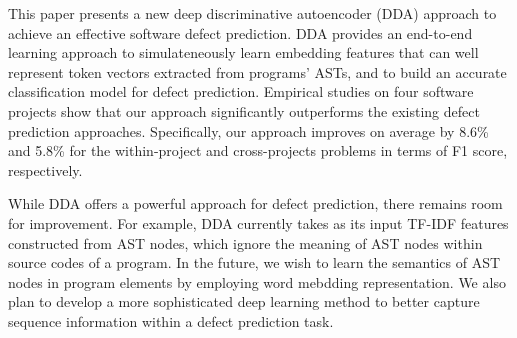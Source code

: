 
This paper presents a new deep  discriminative autoencoder (DDA) approach to achieve an effective software defect prediction. DDA provides an end-to-end learning approach to simulateneously learn embedding features that can well represent token vectors extracted from programs' ASTs, and to build an accurate classification model for defect prediction. Empirical studies on four software projects show that our approach significantly outperforms the existing defect prediction approaches. Specifically, our approach improves on average by 8.6\% and 5.8\% for the within-project and cross-projects problems in terms of F1 score, respectively. 

While DDA offers a powerful approach for defect prediction, there remains room for improvement. For example, DDA currently takes as its input TF-IDF features constructed from AST nodes, which ignore the meaning of AST nodes within source codes of a program. In the future, we wish to learn the semantics of AST nodes in program elements by employing word mebdding representation. We also plan to develop a more sophisticated deep learning method to better capture sequence information within a defect prediction task. 

%


